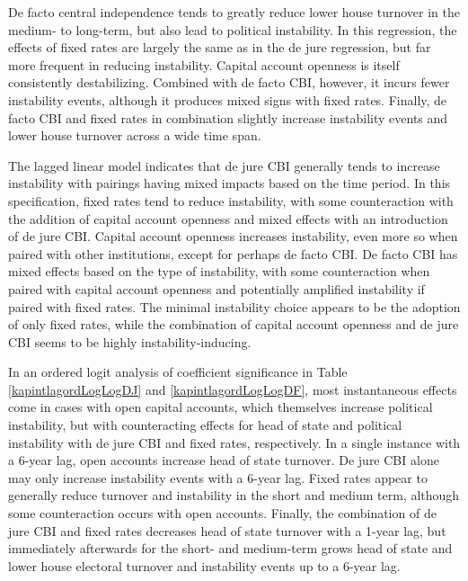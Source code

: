 \documentclass{article}
\begin{document}
    De facto central independence tends to greatly reduce lower house turnover in the medium- to long-term, but also lead to political instability. In this regression, the effects of fixed rates are largely the same as in the de jure regression, but far more frequent in reducing instability. Capital account openness is itself consistently destabilizing. Combined with de facto CBI, however, it incurs fewer instability events, although it produces mixed signs with fixed rates. Finally, de facto CBI and fixed rates in combination slightly increase instability events and lower house turnover across a wide time span.

    The lagged linear model indicates that de jure CBI generally tends to increase instability with pairings having mixed impacts based on the time period. In this specification, fixed rates tend to reduce instability, with some counteraction with the addition of capital account openness and mixed effects with an introduction of de jure CBI. Capital account openness increases instability, even more so when paired with other institutions, except for perhaps de facto CBI. De facto CBI has mixed effects based on the type of instability, with some counteraction when paired with capital account openness and potentially amplified instability if paired with fixed rates. The minimal instability choice appears to be the adoption of only fixed rates, while the combination of capital account openness and de jure CBI seems to be highly instability-inducing.

    In an ordered logit analysis of coefficient significance in Table \ref*{kapintlagordLogLogDJ} and \ref*{kapintlagordLogLogDF}, most instantaneous effects come in cases with open capital accounts, which themselves increase political instability, but with counteracting effects for head of state and political instability with de jure CBI and fixed rates, respectively. In a single instance with a 6-year lag, open accounts increase head of state turnover. De jure CBI alone may only increase instability events with a 6-year lag. Fixed rates appear to generally reduce turnover and instability in the short and medium term, although some counteraction occurs with open accounts. Finally, the combination of de jure CBI and fixed rates decreases head of state turnover with a 1-year lag, but immediately afterwards for the short- and medium-term grows head of state and lower house electoral turnover and instability events up to a 6-year lag.
\end{document}
